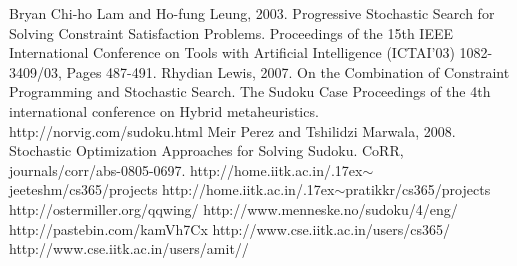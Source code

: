 \documentclass[a4paper]{article}
\begin{document}
\begin{thebibliography}{99}
   Bryan Chi-ho Lam and Ho-fung Leung, 2003. Progressive Stochastic Search for Solving Constraint Satisfaction Problems. Proceedings of the 15th IEEE International Conference on Tools with Artificial Intelligence (ICTAI’03) 1082-3409/03, Pages 487-491.
   Rhydian Lewis, 2007. On the Combination of Constraint Programming and Stochastic Search. The Sudoku Case Proceedings of the 4th international conference on Hybrid metaheuristics. 
   http://norvig.com/sudoku.html
   Meir Perez and Tshilidzi Marwala, 2008. Stochastic Optimization Approaches for Solving Sudoku. CoRR, journals/corr/abs-0805-0697.
   http://home.iitk.ac.in/{\raise.17ex\hbox{$\scriptstyle\sim$}}jeeteshm/cs365/projects
   http://home.iitk.ac.in/{\raise.17ex\hbox{$\scriptstyle\sim$}}pratikkr/cs365/projects
   http://ostermiller.org/qqwing/
   http://www.menneske.no/sudoku/4/eng/
   http://pastebin.com/kamVh7Cx
   http://www.cse.iitk.ac.in/users/cs365/
   http://www.cse.iitk.ac.in/users/amit//
\end{thebibliography}
\end{document}
